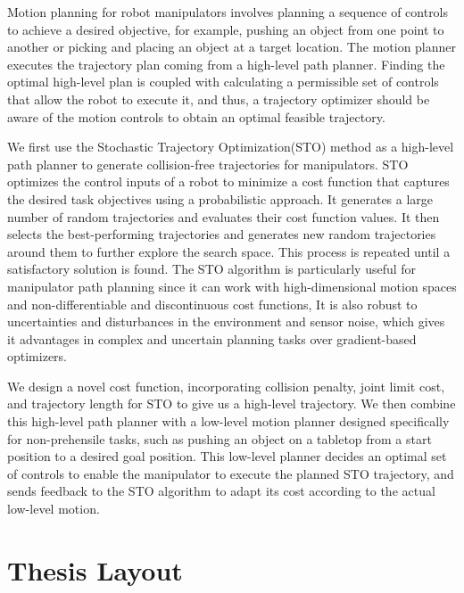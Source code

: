 Motion planning for robot manipulators involves planning a sequence of controls to achieve a desired objective, for example, pushing an object from one point to another or picking and placing an object at a target location. The motion planner executes the trajectory plan coming from a high-level path planner. Finding the optimal high-level plan is coupled with calculating a permissible set of controls that allow the robot to execute it, and thus, a trajectory optimizer should be aware of the motion controls to obtain an optimal feasible trajectory. 

We first use the Stochastic Trajectory Optimization(STO) method as a high-level path planner to generate collision-free trajectories for manipulators. STO optimizes the control inputs of a robot to minimize a cost function that captures the desired task objectives using a probabilistic approach. It generates a large number of random trajectories and evaluates their cost function values. It then selects the best-performing trajectories and generates new random trajectories around them to further explore the search space. This process is repeated until a satisfactory solution is found. The STO algorithm is particularly useful for manipulator path planning since it can work with high-dimensional motion spaces and non-differentiable and discontinuous cost functions, It is also robust to uncertainties and disturbances in the environment and sensor noise, which gives it advantages in complex and uncertain planning tasks over gradient-based optimizers. 

We design a novel cost function, incorporating collision penalty, joint limit cost, and trajectory length for STO to give us a high-level trajectory. We then combine this high-level path planner with a low-level motion planner designed specifically for non-prehensile tasks, such as pushing an object on a tabletop from a start position to a desired goal position. This low-level planner decides an optimal set of controls to enable the manipulator to execute the planned STO trajectory, and sends feedback to the STO algorithm to adapt its cost according to the actual low-level motion.


\section{Thesis Layout}

